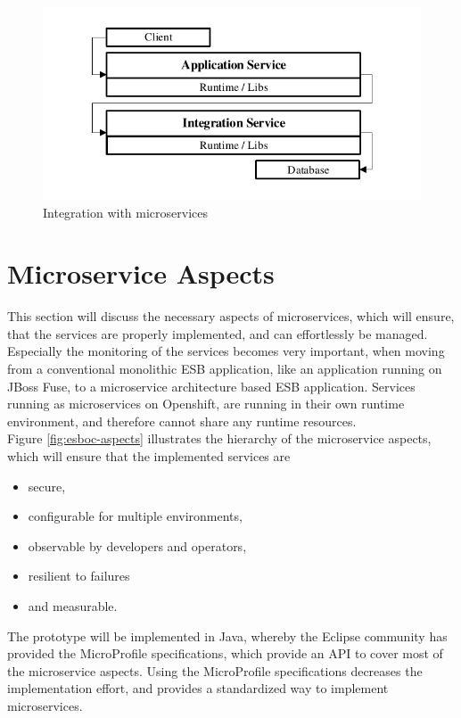 \begin{figure}[htbp]
	\centering
	\includegraphics[scale=1]{images/esboc-design-microservice.pdf}
	\caption{Integration with microservices}
	\label{fig:esboc-design-services}
\end{figure}

\section{Microservice Aspects}
\label{sec:esboc-aspects}
This section will discuss the necessary aspects of microservices, which will ensure, that the services are properly implemented, and can effortlessly be managed. Especially the monitoring of the services becomes very important, when moving from a conventional monolithic ESB application, like an application running on JBoss Fuse, to a microservice architecture based ESB application. Services running as microservices on Openshift, are running in their own runtime environment, and therefore cannot share any runtime resources. \\

Figure \vref{fig:esboc-aspects} illustrates the hierarchy of the microservice aspects, which will ensure that the implemented services are
\begin{itemize}
	\item secure,
	\item configurable for multiple environments,
	\item observable by developers and operators,
	\item resilient to failures
	\item and measurable.
\end{itemize}

The prototype will be implemented in Java, whereby the Eclipse community has provided the MicroProfile specifications, which provide an API to cover most of the microservice aspects. Using the MicroProfile specifications decreases the implementation effort, and provides a standardized way to implement microservices\cite{EclipseMicroprofileCharter2017}. \\

